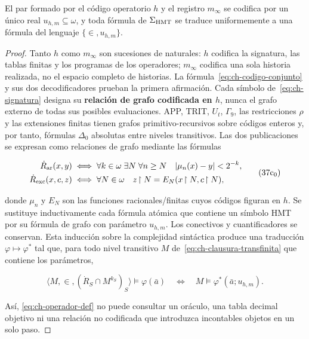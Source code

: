 \begin{lemma}
\label{thm:ch-6}
El par formado por
el código operatorio \(h\) y el registro \(m_\infty\) se codifica por un único
real \(u_{h,m}\subseteq\omega\), y toda fórmula de \(\Sigma_{\rm HMT}\) se
traduce uniformemente a una fórmula del lenguaje \(\{\in,u_{h,m}\}\).

\end{lemma}
\begin{proof}
Tanto \(h\) como \(m_\infty\) son sucesiones de naturales: \(h\)
codifica la signatura, las tablas finitas y los programas de los operadores;
\(m_\infty\) codifica una sola historia realizada, no el espacio completo de
historias. La fórmula~\eqref{eq:ch-codigo-conjunto} y sus dos decodificadores prueban la primera
afirmación. Cada símbolo de~\eqref{eq:ch-signatura} designa su \textbf{relación de grafo codificada en \(h\)}, nunca el grafo externo de todas sus posibles evaluaciones. APP,
TRIT, \(U_t\), \(\Gamma_9\), las restricciones \(\rho\) y las extensiones
finitas tienen grafos primitivo-recursivos sobre códigos enteros y, por tanto,
fórmulas \(\Delta_0\) absolutas entre niveles transitivos. Las dos
publicaciones se expresan como relaciones de grafo mediante las fórmulas

\[
 \begin{aligned}
 \dot R_{\rm ar}(x,y)
 &\;\Longleftrightarrow\;
 \forall k\in\omega\;\exists N\;\forall n\ge N\quad
 |\mu_n(x)-y|<2^{-k},\\
 \dot R_{\rm exc}(x,c,z)
 &\;\Longleftrightarrow\;
 \forall N\in\omega\quad z\!\upharpoonright N
   =E_N(x\!\upharpoonright N,c\!\upharpoonright N),
 \end{aligned}
\tag{37c$_0$}\label{eq:ch-grafos-publicacion}
\]

donde \(\mu_n\) y \(E_N\) son las funciones racionales/finitas cuyos códigos
figuran en \(h\). Se sustituye inductivamente cada fórmula atómica que contiene
un símbolo HMT por su fórmula de grafo con parámetro \(u_{h,m}\). Los
conectivos y cuantificadores se conservan. Esta inducción sobre la complejidad
sintáctica produce una traducción \(\varphi\mapsto\varphi^*\) tal que, para
todo nivel transitivo \(M\) de~\eqref{eq:ch-clausura-transfinita} que contiene los parámetros,

\[
 \langle M,\in,(\dot R_S\cap M^{k_S})_S\rangle
   \models\varphi(\bar a)
 \quad\Longleftrightarrow\quad
 M\models\varphi^*(\bar a;u_{h,m}).
\tag{37c}\label{eq:ch-eliminacion-uniforme}
\]

Así, \eqref{eq:ch-operador-def} no puede consultar un oráculo, una tabla decimal objetivo ni una
relación no codificada que introduzca incontables objetos en un solo paso.
\end{proof}

